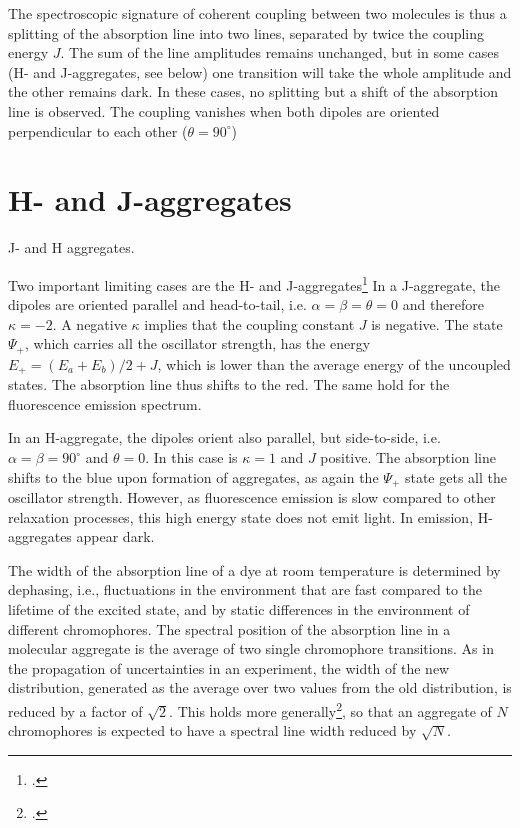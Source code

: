 The spectroscopic signature of coherent coupling between two molecules is thus a splitting of the absorption line into two lines, separated by twice the coupling energy $J$. The sum of the line amplitudes remains unchanged, but in some cases (H- and J-aggregates, see below) one transition will take the whole amplitude and the other remains dark. In these cases, no splitting but a shift of the absorption line is observed. The coupling vanishes when both dipoles are oriented perpendicular to each other ($\theta = 90^\circ$)


\section{H- and J-aggregates}

\begin{marginfigure}

\caption{J- and H aggregates.}
\end{marginfigure}


Two important limiting cases are the H- and J-aggregates\footcite[chapters 2.1.4.3, 2.2.5.3]{KoehlerBaessler2015} In a J-aggregate, the dipoles are oriented parallel and head-to-tail, i.e. $\alpha = \beta = \theta = 0$ and therefore $\kappa = -2$. A negative $\kappa$ implies that the coupling constant $J$ is negative. The state $\Psi_+$, which carries all the oscillator strength, has the energy $E_+ = (E_a + E_b) / 2 + J$, which is lower than the average energy of the uncoupled states. The absorption line thus shifts to the red. The same hold for the fluorescence emission spectrum.

In an H-aggregate, the dipoles orient also parallel, but side-to-side, i.e.  $\alpha = \beta = 90^\circ$ and $\theta = 0$. In this case is $\kappa =1$ and $J$ positive. The absorption line shifts to the blue upon formation of aggregates, as again the  $\Psi_+$ state gets all the oscillator strength. However, as fluorescence emission is slow compared to other relaxation processes, this high energy state does not emit light. In emission, H-aggregates appear dark.

The width of the absorption line of a dye at room temperature is determined by dephasing, i.e., fluctuations in the environment that are fast compared to the lifetime of the excited state, and by static differences in the environment of different chromophores. The spectral position of the absorption line in a molecular aggregate is the average of two single chromophore transitions. As in the propagation of uncertainties in an experiment, the width of the new distribution, generated as the average over two values from the old distribution, is reduced by a factor of $\sqrt{2}$. This holds more generally\footcite{Knapp1984}, so that an aggregate of $N$ chromophores is expected to have a spectral line width reduced by $\sqrt{N}$.




